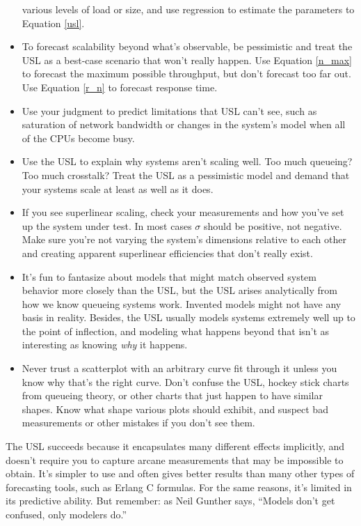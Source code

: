 \documentclass{vivid_layout}
\begin{document}
\begin{itemize}
various levels of load or size, and use regression to estimate the parameters to
Equation \ref{usl}.
\item To forecast scalability beyond what's observable, be pessimistic and treat
the USL as a best-case scenario that won't really happen. Use Equation
\ref{n_max} to forecast the maximum possible throughput, but don't forecast too
far out. Use Equation \ref{r_n} to forecast response time.
\item Use your judgment to predict limitations that USL can't see, such as
saturation of network bandwidth or changes in the system's model when all of the
CPUs become busy.
\item Use the USL to explain why systems aren't scaling well. Too much queueing?
Too much crosstalk? Treat the USL as a pessimistic model and demand that your
systems scale at least as well as it does.
\item If you see superlinear scaling, check your measurements and how you've set
up the system under test. In most cases $\sigma$ should be positive, not
negative. Make sure you're not varying the system's dimensions relative to each
other and creating apparent superlinear efficiencies that don't really exist.
\item It's fun to fantasize about models that might match observed system
behavior more closely than the USL, but the USL arises analytically from how we
know queueing systems work. Invented models might not have any basis in reality.
Besides, the USL usually models systems extremely well up to the point of
inflection, and modeling what happens beyond that isn't as interesting as
knowing {\itshape why} it happens.
\item Never trust a scatterplot with an arbitrary curve fit through it unless
you know why that's the right curve. Don't confuse the USL, hockey stick charts
from queueing theory, or other charts that just happen to have similar shapes.
Know what shape various plots should exhibit, and suspect bad measurements or
other mistakes if you don't see them.
\end{itemize}

The USL succeeds because it encapsulates many different effects implicitly, and
doesn't require you to capture arcane measurements that may be impossible to
obtain. It's simpler to use and often gives better results than many other types of
forecasting tools, such as Erlang C formulas. For the same reasons, it's limited
in its predictive ability. But remember: as Neil Gunther says, ``Models don't
get confused, only modelers do.''
\end{document}
